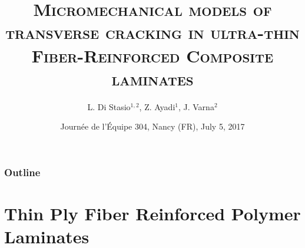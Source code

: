 \documentclass[first,firstsupp,lastsupp,handout,last,hyperref,table]{ETHclass}
\makeatletter
\newenvironment{withoutheadline}{
         \setbeamertemplate{headline}{%
\vspace{35pt}
}
    }{}
\makeatother
\begin{document}

\title[\textsc{Modeling of thin ply effects on microdamage}]{\textsc{Micromechanical models of transverse cracking in ultra-thin Fiber-Reinforced Composite laminates}}
\author{ L. Di Stasio$^{1,2}$, Z. Ayadi$^{1}$, J. Varna$^{2}$}
\date{Journ\'ee de l'\'Equipe 304, Nancy (FR), July 5, 2017}

\begin{frame}[plain]
    \titlepage
\end{frame}

\begin{withoutheadline}
\begin{frame}
\frametitle{Outline}
\justifying
\vspace*{-0.5cm}
\tableofcontents[hidesubsections]
\end{frame}
\end{withoutheadline}



\section[Thin Ply FRP Laminates]{Thin Ply Fiber Reinforced Polymer Laminates}
\end{document}
